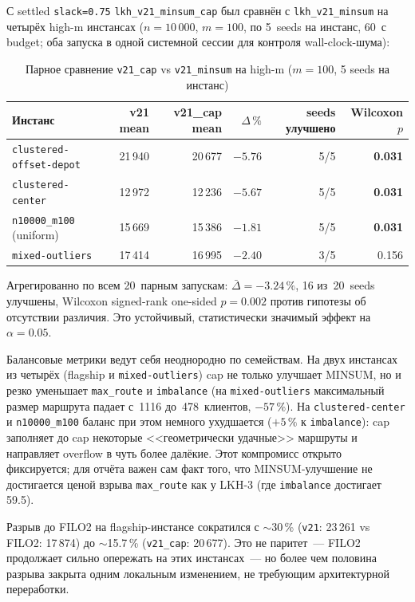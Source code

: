 \documentclass[14pt,a4paper]{extarticle}
\begin{document}
С settled \texttt{slack=0.75} \texttt{lkh\_v21\_minsum\_cap} был сравнён с \texttt{lkh\_v21\_minsum} на четырёх high-m инстансах ($n=10\,000$, $m=100$, по 5~seeds на инстанс, 60~с budget; оба запуска в одной системной сессии для контроля wall-clock-шума):

\begin{table}[H]
\centering
\caption{Парное сравнение \texttt{v21\_cap} vs \texttt{v21\_minsum} на high-m ($m=100$, 5 seeds на инстанс)}
\small
\begin{tabular}{lrrrrr}
\toprule
Инстанс & v21 mean & v21\_cap mean & $\Delta\,\%$ & seeds улучшено & Wilcoxon $p$\\
\midrule
\texttt{clustered-offset-depot}    & 21\,940 & 20\,677 & \textbf{$-5.76$} & 5/5 & \textbf{0.031}\\
\texttt{clustered-center}          & 12\,972 & 12\,236 & \textbf{$-5.67$} & 5/5 & \textbf{0.031}\\
\texttt{n10000\_m100} (uniform)    & 15\,669 & 15\,386 & $-1.81$ & 5/5 & \textbf{0.031}\\
\texttt{mixed-outliers}            & 17\,414 & 16\,995 & $-2.40$ & 3/5 & 0.156\\
\bottomrule
\end{tabular}
\normalsize
\end{table}

Агрегированно по всем 20~парным запускам: $\bar{\Delta} = -3.24\,\%$, 16 из~20~seeds улучшены, Wilcoxon signed-rank one-sided $p = 0.002$ против гипотезы об отсутствии различия. Это устойчивый, статистически значимый эффект на $\alpha=0.05$.

Балансовые метрики ведут себя неоднородно по семействам. На двух инстансах из четырёх (flagship и \texttt{mixed-outliers}) cap не только улучшает MINSUM, но и резко уменьшает \texttt{max\_route} и \texttt{imbalance} (на \texttt{mixed-outliers} максимальный размер маршрута падает с~1116 до~478~клиентов, $-57\,\%$). На \texttt{clustered-center} и \texttt{n10000\_m100} баланс при этом немного ухудшается ($+5\,\%$ к \texttt{imbalance}): cap заполняет до cap некоторые <<геометрически удачные>> маршруты и направляет overflow в чуть более далёкие. Этот компромисс открыто фиксируется; для отчёта важен сам факт того, что MINSUM-улучшение не достигается ценой взрыва \texttt{max\_route} как у LKH-3 (где \texttt{imbalance} достигает 59.5).

Разрыв до FILO2 на flagship-инстансе сократился с $\sim$30\,\% (\texttt{v21}: 23\,261 vs FILO2: 17\,874) до $\sim$15.7\,\% (\texttt{v21\_cap}: 20\,677). Это не паритет~--- FILO2 продолжает сильно опережать на этих инстансах~--- но более чем половина разрыва закрыта одним локальным изменением, не требующим архитектурной переработки.
\end{document}
